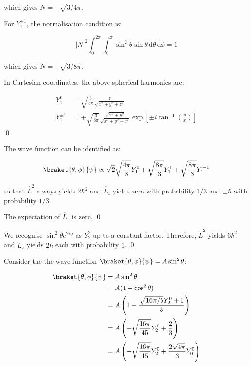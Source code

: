 \documentclass[12pt]{article}
\begin{document}
which gives $N = \pm \sqrt{3/4\pi}$. 

For $Y_{1}^{\pm 1}$, the normalisation condition is:

\begin{equation}
    \left\lvert N \right\rvert^{2} \int_{0}^{2\pi} \int_{0}^{\pi} \sin^{2}{\theta} \sin{\theta} \, \mathrm{d}\theta \, \mathrm{d}\phi = 1
\end{equation}

which gives $N = \pm \sqrt{3/8\pi}$.

In Cartesian coordinates, the above spherical harmonics are:

\begin{equation}
\begin{split}
    Y_{1}^{0} &= \sqrt{\frac{3}{4\pi}} \frac{z}{\sqrt{x^{2} + y^{2} + z^{2}}} \\
    Y_{1}^{\pm 1} &= \mp \sqrt{\frac{3}{8\pi}} \frac{\sqrt{x^{2} + y^{2}}}{\sqrt{x^{2} + y^{2} + z^{2}}} \exp \left[ \pm i \tan^{-1}{\left( \frac{y}{x} \right)} \right]
\end{split}
\end{equation}
\qed


The wave function can be identified as:

\begin{equation}
    \braket{\theta, \phi}{\psi} \propto \sqrt{2} \sqrt{\frac{4\pi}{3}} Y_{1}^{0} + \sqrt{\frac{8\pi}{3}} Y_{1}^{1} + \sqrt{\frac{8\pi}{3}} Y_{1}^{-1}
\end{equation}

so that $\hat{L}^{2}$ always yields $2\hbar^{2}$ and $\hat{L}_{z}$ yields zero with probability $1/3$ and $\pm \hbar$ with probability $1/3$.

The expectation of $\hat{L}_{z}$ is zero.
\qed


We recognise $\sin^{2}{\theta} e^{2i\phi}$ as $Y_{2}^{2}$ up to a constant factor. Therefore, $\hat{L}^{2}$ yields $6\hbar^{2}$ and $\hat{L}_{z}$ yields $2\hbar$ each with probability $1$.
\qed


Consider the the wave function $\braket{\theta, \phi}{\psi} = A \sin^{2}{\theta}$:

\begin{equation}
\begin{split}
    \braket{\theta, \phi}{\psi} &= A \sin^{2}{\theta} \\
    &= A (1 - \cos^{2}{\theta}) \\
    &= A \left( 1 - \frac{\sqrt{16\pi/5}Y_{2}^{0} + 1}{3} \right) \\
    &= A \left( - \sqrt{\frac{16\pi}{45}} Y_{2}^{0} + \frac{2}{3} \right) \\
    &= A \left( - \sqrt{\frac{16\pi}{45}} Y_{2}^{0} + \frac{2\sqrt{4\pi}}{3} Y_{0}^{0} \right) \\
\end{split}
\end{equation}
\end{document}
